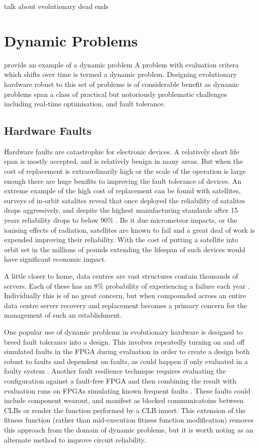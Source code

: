 \todo talk about evolutionary dead ends

\section{Dynamic Problems}

\todo provide an example of a dynamic problem
A problem with evaluation critera which shifts over time is termed a dynamic problem. Designing
evolutionary hardware robust to this set of problems is of considerable benefit as
dynamic problems span a class of practical but notoriously problematic challenges including
real-time optimisation, and fault tolerance.

\subsection{Hardware Faults}
Hardware faults are catastrophic for electronic devices. A relatively short life span is
mostly accepted, and is relatively benign in many areas. But when the cost of replacement is
extraordinarily high or the scale of the operation is large enough there are huge benifits
to improving the fault tolerance of devices. An extreme example of the high cost of replacement
can be found with satellites, surveys of in-orbit satalites reveal that once deployed the
reliability of satalites drops aggressively, and despite the highest manufacturing standards
after 15 years reliability drops to below
90\% \cite{CASTET20091718}. Be it due micrometeor impacts,
or the ionising effects of radiation, satellites are known to fail and a great deal of
work is expended improving their reliability. With the cost
of putting a satellite into orbit set in the millions of pounds extending the lifespan
of such devices would have significant economic impact.

A little closer to home, data centres are vast structures contain thousands of servers.
Each of these has an 8\% probability of experiencing a failure each year
 \cite{Vishwanath:2010:CCC:1807128.1807161}.
Individually this is of no great concern, but when compounded across an entire data centre
server recovery and replacement becomes a primary concern for the management of
such an establishment.

One popular use of dynamic problems in evolutionary hardware is designed to breed
fault tolerance into a
design. This involves repeatedly turning on and off simulated faults in the FPGA during
evaluation in order to
create a design both robust to faults and dependent on faults, as could happen if
only evaluated in a faulty system \cite{651463}. Another fault resilience
technique requires evaluating the configuration
against a fault-free FPGA and then combining the result with evaluation runs on FPGAs
simulating known frequent faults \cite{651463}\cite{Keymeulen2000}. These faults could include component
wearout, and manifest as blocked communicatoins between CLBs or render the function
performed by a CLB innert. This extension of the fitness function (rather than
mid-execution fitness function modification) removes this approach from the domain of dynamic problems,
but it is worth noting as an alternate method to improve circuit reliability.

